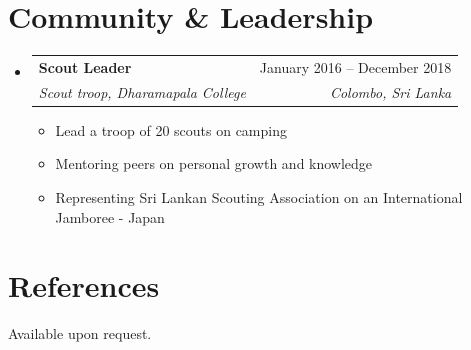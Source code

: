 \documentclass[letterpaper,11pt]{article}
\makeatletter
\newcommand{\resumeItem}[1]{
  \item\small{
    {#1 \vspace{-2pt}}
  }
}
\newcommand{\resumeSubheading}[4]{
  \vspace{-2pt}\item
    \begin{tabular*}{0.97\textwidth}[t]{l@{\extracolsep{\fill}}r}
      \textbf{#1} & #2 \\
      \textit{\small#3} & \textit{\small #4} \\
    \end{tabular*}\vspace{-7pt}
}
\newcommand{\resumeSubHeadingListStart}{\begin{itemize}[leftmargin=0.15in, label={}]}
\newcommand{\resumeSubHeadingListEnd}{\end{itemize}}
\newcommand{\resumeItemListStart}{\begin{itemize}}
\newcommand{\resumeItemListEnd}{\end{itemize}\vspace{-5pt}}
\makeatother
\begin{document}
\section{Community \& Leadership}
  \resumeSubHeadingListStart

    \resumeSubheading
      {Scout Leader}{January 2016 – December 2018}
      {Scout troop, Dharamapala College}{Colombo, Sri Lanka}
      \resumeItemListStart
        \resumeItem{Lead a troop of 20 scouts on camping}
        \resumeItem{Mentoring peers on personal growth and knowledge}
        \resumeItem{Representing Sri Lankan Scouting Association on an International Jamboree - Japan}
      \resumeItemListEnd

    \resumeSubHeadingListEnd

\section{References}
Available upon request.
\end{document}
